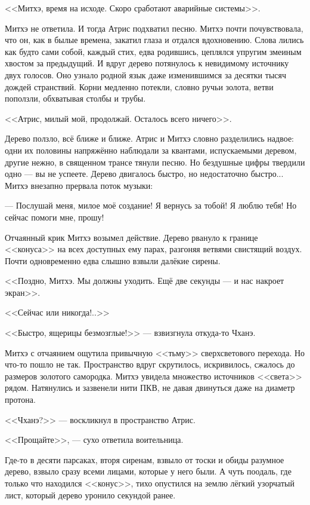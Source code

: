 <<Митхэ, время на исходе.
Скоро сработают аварийные системы>>.

Митхэ не ответила.
И тогда Атрис подхватил песню.
Митхэ почти почувствовала, что он, как в былые времена, закатил глаза и отдался вдохновению.
Слова лились как будто сами собой, каждый стих, едва родившись, цеплялся упругим змеиным хвостом за предыдущий.
И вдруг дерево потянулось к невидимому источнику двух голосов.
Оно узнало родной язык даже изменившимся за десятки тысяч дождей странствий.
Корни медленно потекли, словно ручьи золота, ветви поползли, обхватывая столбы и трубы.

<<Атрис, милый мой, продолжай.
Осталось всего ничего>>.

Дерево ползло, всё ближе и ближе.
Атрис и Митхэ словно разделились надвое: одни их половины напряжённо наблюдали за квантами, испускаемыми деревом, другие нежно, в священном трансе тянули песню.
Но бездушные цифры твердили одно --- вы не успеете.
Дерево двигалось быстро, но недостаточно быстро...
Митхэ внезапно прервала поток музыки:

--- Послушай меня, милое моё создание!
Я вернусь за тобой!
Я люблю тебя!
Но сейчас помоги мне, прошу!

Отчаянный крик Митхэ возымел действие.
Дерево рвануло к границе <<конуса>> на всех доступных ему парах, разгоняя ветвями свистящий воздух.
Почти одновременно едва слышно взвыли далёкие сирены.

<<Поздно, Митхэ.
Мы должны уходить.
Ещё две секунды --- и нас накроет экран>>.

<<Сейчас или никогда!..>>

<<Быстро, ящерицы безмозглые!>> --- взвизгнула откуда-то Чханэ.

Митхэ с отчаянием ощутила привычную <<тьму>> сверхсветового перехода.
Но что-то пошло не так.
Пространство вдруг скрутилось, искривилось, сжалось до размеров золотого самородка.
Митхэ увидела множество источников <<света>> рядом.
Натянулись и зазвенели нити ПКВ, не давая двинуться даже на диаметр протона.

<<Чханэ?>> --- воскликнул в пространство Атрис.

<<Прощайте>>, --- сухо ответила воительница.

Где-то в десяти парсаках, вторя сиренам, взвыло от тоски и обиды разумное дерево, взвыло сразу всеми лицами, которые у него были.
А чуть поодаль, где только что находился <<конус>>, тихо опустился на землю лёгкий узорчатый лист, который дерево уронило секундой ранее.

